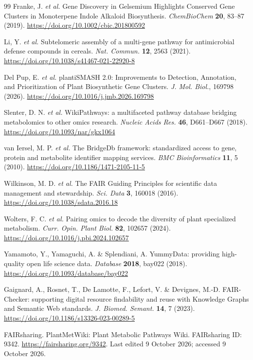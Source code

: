 \documentclass[11pt,a4paper]{article}
\begin{document}
\begin{thebibliography}{99}
Franke, J. \textit{et al.} Gene Discovery in Gelsemium Highlights Conserved Gene Clusters in Monoterpene Indole Alkaloid Biosynthesis. \textit{ChemBioChem} \textbf{20}, 83--87 (2019). \url{https://doi.org/10.1002/cbic.201800592}

Li, Y. \textit{et al.} Subtelomeric assembly of a multi-gene pathway for antimicrobial defense compounds in cereals. \textit{Nat. Commun.} \textbf{12}, 2563 (2021). \url{https://doi.org/10.1038/s41467-021-22920-8}

Del Pup, E. \textit{et al.} plantiSMASH 2.0: Improvements to Detection, Annotation, and Prioritization of Plant Biosynthetic Gene Clusters. \textit{J. Mol. Biol.}, 169798 (2026). \url{https://doi.org/10.1016/j.jmb.2026.169798}

Slenter, D. N. \textit{et al.} WikiPathways: a multifaceted pathway database bridging metabolomics to other omics research. \textit{Nucleic Acids Res.} \textbf{46}, D661--D667 (2018). \url{https://doi.org/10.1093/nar/gkx1064}

van Iersel, M. P. \textit{et al.} The BridgeDb framework: standardized access to gene, protein and metabolite identifier mapping services. \textit{BMC Bioinformatics} \textbf{11}, 5 (2010). \url{https://doi.org/10.1186/1471-2105-11-5}

Wilkinson, M. D. \textit{et al.} The FAIR Guiding Principles for scientific data management and
stewardship. \textit{Sci. Data} \textbf{3}, 160018 (2016).
\url{https://doi.org/10.1038/sdata.2016.18}

Wolters, F. C. \textit{et al.} Pairing omics to decode the diversity of plant specialized metabolism. \textit{Curr. Opin. Plant Biol.} \textbf{82}, 102657 (2024). \url{https://doi.org/10.1016/j.pbi.2024.102657}

Yamamoto, Y., Yamaguchi, A. \& Splendiani, A. YummyData: providing high-quality open life science
data. \textit{Database} \textbf{2018}, bay022 (2018). \url{https://doi.org/10.1093/database/bay022}

Gaignard, A., Rosnet, T., De Lamotte, F., Lefort, V. \& Devignes, M.-D. FAIR-Checker: supporting
digital resource findability and reuse with Knowledge Graphs and Semantic Web standards. \textit{J.
Biomed. Semant.} \textbf{14}, 7 (2023). \url{https://doi.org/10.1186/s13326-023-00289-5}

FAIRsharing. PlantMetWiki: Plant Metabolic Pathways Wiki. FAIRsharing ID: 9342.
\url{https://fairsharing.org/9342}. Last edited 9 October 2026; accessed 9 October 2026.


\end{thebibliography}
\end{document}

